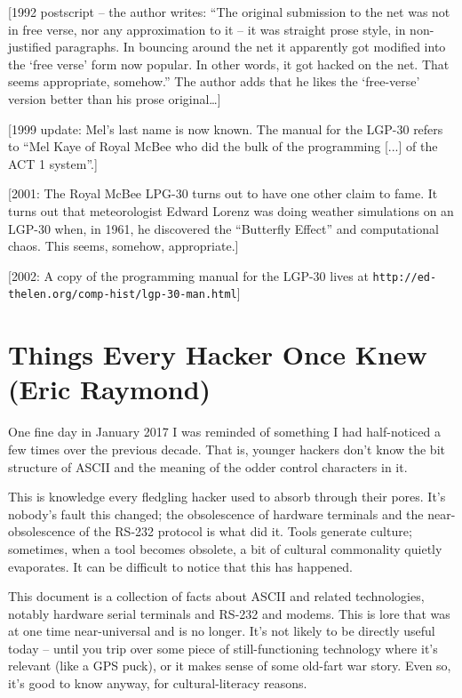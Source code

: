 \documentclass[10pt,twoside,openright]{memoir}
\begin{document}
\vskip 0.4in

[1992 postscript -- the author writes: ``The original submission to the net was not in free verse, nor any approximation to it -- it was straight prose style, in non-justified paragraphs. In bouncing around the net it apparently got modified into the `free verse' form now popular. In other words, it got hacked on the net. That seems appropriate, somehow.'' The author adds that he likes the `free-verse' version better than his prose original\dots]

[1999 update: Mel's last name is now known. The manual for the LGP-30 refers to ``Mel Kaye of Royal McBee who did the bulk of the programming [...] of the ACT 1 system''.]

[2001: The Royal McBee LPG-30 turns out to have one other claim to fame. It turns out that meteorologist Edward Lorenz was doing weather simulations on an LGP-30 when, in 1961, he discovered the ``Butterfly Effect'' and computational chaos. This seems, somehow, appropriate.]

[2002: A copy of the programming manual for the LGP-30 lives at {\footnotesize \texttt{http://ed-thelen.org/comp-hist/lgp-30-man.html}}]


\chapter{Things Every Hacker Once Knew (Eric Raymond)}

One fine day in January 2017 I was reminded of something I had half-noticed a few times over the previous decade. That is, younger hackers don't know the bit structure of ASCII and the meaning of the odder control characters in it.

This is knowledge every fledgling hacker used to absorb through their pores. It's nobody's fault this changed; the obsolescence of hardware terminals and the near-obsolescence of the RS-232 protocol is what did it. Tools generate culture; sometimes, when a tool becomes obsolete, a bit of cultural commonality quietly evaporates. It can be difficult to notice that this has happened.

This document is a collection of facts about ASCII and related technologies, notably hardware serial terminals and RS-232 and modems. This is lore that was at one time near-universal and is no longer. It's not likely to be directly useful today -- until you trip over some piece of still-functioning technology where it's relevant (like a GPS puck), or it makes sense of some old-fart war story. Even so, it's good to know anyway, for cultural-literacy reasons.
\end{document}
